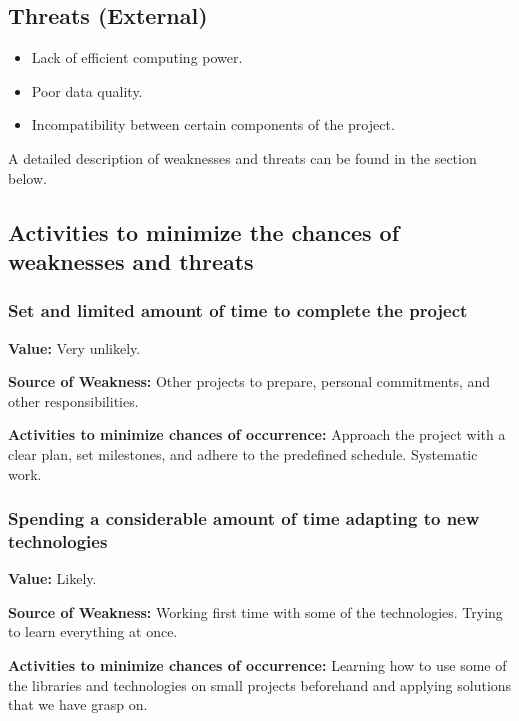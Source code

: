 \documentclass{article}
\begin{document}
\subsection{Threats (External)}
\begin{itemize}
  \item Lack of efficient computing power.
  \item Poor data quality.
  \item Incompatibility between certain components of the project.
\end{itemize}

A detailed description of weaknesses and threats can be found in the section below.
\subsection{Activities to minimize the chances of weaknesses and threats}

\subsubsection{Set and limited amount of time to complete the project}
\noindent \textbf{Value: } Very unlikely.

\vspace{0.5em}
\noindent \textbf{Source of Weakness:} Other projects to prepare, personal commitments, and other responsibilities.

\vspace{0.5em}
\noindent \textbf{Activities to minimize chances of occurrence:} Approach the project with a clear plan, set milestones, and adhere to the predefined schedule. Systematic work.

\subsubsection{Spending a considerable amount of time adapting to new technologies}
\noindent \textbf{Value: } Likely.

\vspace{0.5em}
\noindent \textbf{Source of Weakness:} Working first time with some of the technologies. Trying to learn everything at once.

\vspace{0.5em}
\noindent \textbf{Activities to minimize chances of occurrence:} Learning how to use some of the libraries and technologies on small projects beforehand and applying solutions that we have grasp on.
\end{document}
